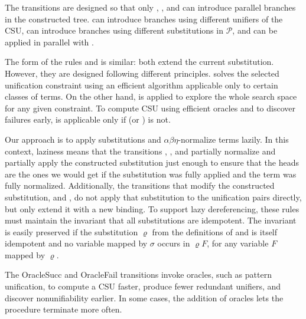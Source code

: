 %
The transitions are designed so that only ,
, and  can introduce parallel branches in the
constructed tree.  can introduce branches
using different unifiers of the CSU,  can introduce branches 
using different substitutions in $\mathcal{P}$, and 
can be applied in parallel with . 

The form of the rules  and  is similar: both
extend the current substitution. However,
they are designed following different principles.  solves
the selected unification constraint using an efficient algorithm applicable only
to certain classes of terms. On the other hand,  is applied to
explore the whole search space for any given constraint. To compute CSU using efficient oracles and to discover
failures early,  is applicable only if 
(or ) is not.

Our approach is to apply substitutions and $\alpha\beta\eta$-normalize terms
lazily. In this context, laziness means that the transitions
, , and
 partially normalize and partially apply the constructed
substitution just enough to ensure that the heads are the ones we would get if
the substitution was fully applied and the term was fully normalized. 
Additionally, the transitions that modify the constructed substitution,
 and , do not apply that substitution to the
unification pairs directly, but only extend it with a new binding. To support
lazy dereferencing, these rules must maintain the
invariant that all substitutions are idempotent. The invariant is easily
preserved if the substitution $\varrho$ from the definitions of
 and  is itself idempotent and no variable
mapped by $\sigma$ occurs in $\varrho F$, for any variable $F$ mapped by
$\varrho$.

The \textsf{OracleSucc} and \textsf{OracleFail} transitions
invoke oracles, such as pattern unification,
to compute a CSU faster,
produce fewer redundant unifiers, and
discover nonunifiability earlier.
In some cases, the addition of oracles lets the procedure terminate more often.

